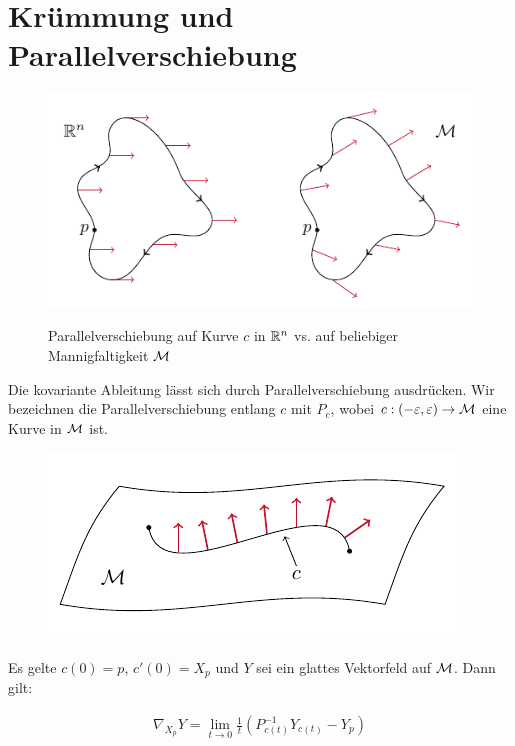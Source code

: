 \section{Krümmung und Parallelverschiebung}

\begin{figure}[H]
\centering
\includegraphics[width=0.7\linewidth]{figures/tikz/parallelshift_rn_vs_manifold.pdf}
\label{img:parallelshift_rn_vs_manifold}
\caption{Parallelverschiebung auf Kurve $c$ in $\mathbb{R}^n$ vs. auf beliebiger Mannigfaltigkeit $\mathcal{M}$}
\end{figure} 

Die kovariante Ableitung lässt sich durch Parallelverschiebung ausdrücken.
Wir bezeichnen die Parallelverschiebung entlang $c$ mit $P_c$, wobei $c: (-\varepsilon , \varepsilon) \to \mathcal{M}$ eine Kurve in $\mathcal{M}$ ist.
\begin{figure}[H]
\centering
\includegraphics[width=0.5\linewidth]{figures/tikz/parallel_shift_on_curve.pdf}
\label{img:parallel_shift_on_curve}
\end{figure} 
Es gelte $c(0)=p$, $c'(0) = X_p$ und $Y$ sei ein glattes Vektorfeld auf $\mathcal{M}$.
Dann gilt:

\begin{align}
\label{eq:parallelcovd}
\nabla_{X_p} Y = \lim\limits_{t \rightarrow 0} \frac{1}{t} \left( P^{-1}_{c(t)} Y_{c(t)} - Y_p\right) 
\end{align}


